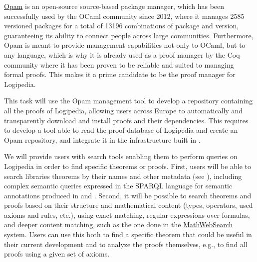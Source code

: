 \begin{workpackage}[id=access,type=RTD,wphases=1-48,
  short=Access,%
  title={Access},
  lead=Inr,InrRM=54,OcaRM=6]
\begin{tasklist}
\begin{task}[id=opam,
      title=Giving access to the infrastructure in proof systems,
      shorttitle=Syst.,
      lead=Oca,OcaRM=6,wphases=13-18]
    \href{https://opam.ocaml.org/}{Opam} is an open-source source-based package manager,
    which has been successfully used by the OCaml community since
    2012, where it manages 2585 versioned packages for a total of
    13196 combinations of package and version, guaranteeing its
    ability to connect people across large communities. Furthermore,
    Opam is meant to provide management capabilities not only to
    OCaml, but to any language, which is why it is already used as a
    proof manager by the Coq community where it has been proven to be
    reliable and suited to managing formal proofs. This makes it a
    prime candidate to be the proof manager for Logipedia.

    This task will use the Opam management tool to develop a
    repository containing all the proofs of Logipedia, allowing users
    across Europe to automatically and transparently download and
    install proofs and their dependencies. This
    requires to develop a tool able to read the proof
    database of Logipedia and create an Opam repository,
    and integrate it in the infrastructure built in .
  \end{task}

  \begin{task}[id=search,
      title=Providing search tools,
      shorttitle=Search,
      lead=Inr,InrRM=18,wphases=19-36]
    We will provide users with search tools enabling them to perform
    queries on Logipedia in order to find specific theorems or proofs.
    First, users will be able to search libraries theorems by their
    names and other metadata (see ),
    including complex semantic queries expressed in the SPARQL
    language for semantic annotations produced in
     and
    . Second, it will be possible to
    search theorems and proofs based on their structure and
    mathematical content (types, operators, used axioms and rules,
    etc.), using exact matching, regular expressions over formulas, and
    deeper content matching, such as the one done in the
    \hyperlink{https://kwarc.info/systems/mws/}{MathWebSearch}
    system. Users can use this both to find a specific theorem that
    could be useful in their current development and to analyze the
    proofs themselves, e.g., to find all proofs using a given set of
    axioms. 
  \end{task}


\end{tasklist}
\end{workpackage}
